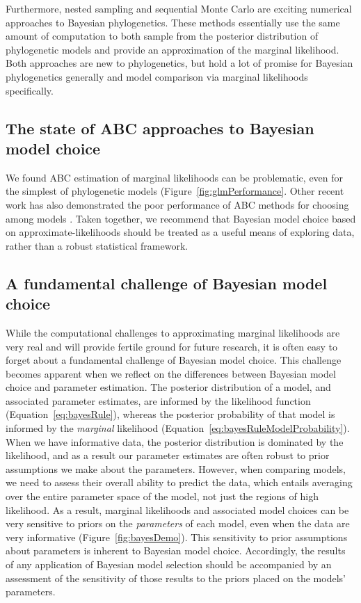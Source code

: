 Furthermore, nested sampling and sequential Monte Carlo are exciting numerical
approaches to Bayesian phylogenetics.
These methods essentially use the same amount of computation to both sample
from the posterior distribution of phylogenetic models and provide an
approximation of the marginal likelihood.
Both approaches are new to phylogenetics, but hold a lot of promise
for Bayesian phylogenetics generally and model comparison via
marginal likelihoods specifically.


\subsection{The state of ABC approaches to Bayesian model choice}

We found ABC estimation of marginal likelihoods can be problematic,
even for the simplest of phylogenetic models
(Figure~\ref{fig:glmPerformance}.
Other recent work has also demonstrated the poor performance of ABC methods for
choosing among models \citep{Robert2011,Oaks2012,Oaks2014reply}.
Taken together, we recommend that Bayesian model choice based on
approximate-likelihoods should be treated as a useful means of exploring data,
rather than a robust statistical framework.


\subsection{A fundamental challenge of Bayesian model choice}

While the computational challenges to approximating marginal likelihoods
are very real and will provide fertile ground for future research,
it is often easy to forget about a fundamental challenge of Bayesian model
choice.
This challenge becomes apparent when we reflect on the differences between
Bayesian model choice and parameter estimation.
The posterior distribution of a model, and associated parameter estimates, are
informed by the likelihood function (Equation~\ref{eq:bayesRule}),
whereas the posterior probability of that model is informed by the
\emph{marginal} likelihood
(Equation~\ref{eq:bayesRuleModelProbability}).
When we have informative data, the posterior distribution is dominated by the
likelihood, and as a result our parameter estimates are often robust to prior
assumptions we make about the parameters.
However, when comparing models, we need to assess their overall ability to
predict the data, which entails averaging over the entire parameter space of
the model, not just the regions of high likelihood.
As a result, marginal likelihoods and associated model choices can be very
sensitive to priors on the \emph{parameters} of each model, even when the data
are very informative (Figure~\ref{fig:bayesDemo}).
This sensitivity to prior assumptions about parameters is inherent to Bayesian
model choice.
Accordingly, the results of any application of Bayesian model selection should
be accompanied by an assessment of the sensitivity of those results to the
priors placed on the models' parameters.


